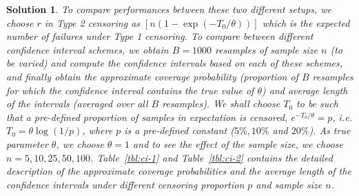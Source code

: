 \documentclass[12pt]{article}
\theoremstyle{problemstyle}
\newtheorem*{solution*}{Solution}
\begin{document}
\begin{solution*}
To compare performances between these two different setups, we choose $r$ in Type 2 censoring as $\left[ n(1 - \exp(-T_0/\theta)) \right]$ which is the expected number of failures under Type 1 censoring. To compare between different confidence interval schemes, we obtain $B = 1000$ resamples of sample size $n$ (to be varied) and compute the confidence intervals based on each of these schemes, and finally obtain the approximate coverage probability (proportion of $B$ resamples for which the confidence interval contains the true value of $\theta$) and average length of the intervals (averaged over all $B$ resamples). We shall choose $T_0$ to be such that a pre-defined proportion of samples in expectation is censored, $e^{-T_0/\theta} = p$, i.e. $T_0 = \theta \log(1/p)$, where $p$ is a pre-defined constant ($5\%, 10\%$ and $20\%$). As true parameter $\theta$, we choose $\theta = 1$ and to see the effect of the sample size, we choose $n = 5, 10, 25, 50, 100$. Table~\ref{tbl:ci-1} and Table~\ref{tbl:ci-2} contains the detailed description of the approximate coverage probabilities and the average length of the confidence intervals under different censoring proportion $p$ and sample size $n$.



\end{solution*}
\end{document}
